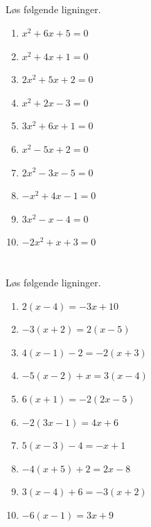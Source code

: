 \documentclass[10pt,a4paper,table]{article}
\begin{document}
\subsection{}
Løs følgende ligninger.

\begin{enumerate}
  \item $x^2 + 6x + 5 = 0$
  \item $x^2 + 4x + 1 = 0$
  \item $2x^2 + 5x + 2 = 0$
  \item $x^2 + 2x - 3 = 0$
  \item $3x^2 + 6x + 1 = 0$
  \item $x^2 - 5x + 2 = 0$
  \item $2x^2 - 3x - 5 = 0$
  \item $-x^2 + 4x - 1 = 0$
  \item $3x^2 - x - 4 = 0$
  \item $-2x^2 + x + 3 = 0$
\end{enumerate}

\section{}
\subsection{}
Løs følgende ligninger.

\begin{enumerate}
  \item $2(x-4)= -3x+10$
  \item $-3(x+2)=2(x-5)$
  \item $4(x-1)-2 = -2(x+3)$
  \item $-5(x-2)+x = 3(x-4)$
  \item $6(x+1)= -2(2x-5)$
  \item $-2(3x-1)=4x+6$
  \item $5(x-3)-4 = -x+1$
  \item $-4(x+5)+2 = 2x-8$
  \item $3(x-4)+6 = -3(x+2)$
  \item $-6(x-1)=3x+9$
\end{enumerate}
\subsection{}
\end{document}
